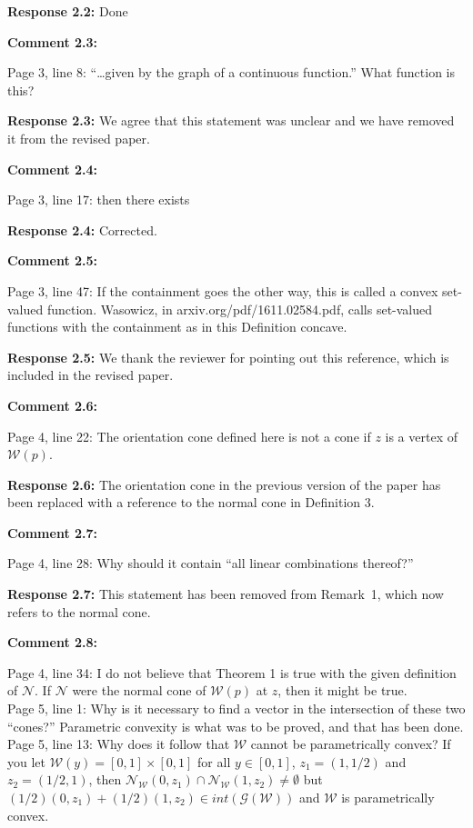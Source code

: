\documentclass[11pt, a4paper]{article}
\newcommand{\comment}[1]{{%
\begin{sffamily}\leavevmode\color{black}#1
\end{sffamily}}}%
\def\v{\vspace{2mm}}
\begin{document}
\v
\textbf{Response 2.2:}
Done

\v
\textbf{Comment 2.3:}
\comment{
Page 3, line 8: ``\dots given by the graph of a continuous function.'' What function is this?}

\v
\textbf{Response 2.3:}
We agree that this statement was unclear and we have removed it from the revised paper.

\v
\textbf{Comment 2.4:}
\comment{
Page 3, line 17: then there exists}

\v
\textbf{Response 2.4:}
Corrected.

\v
\textbf{Comment 2.5:}
\comment{
Page 3, line 47: If the containment goes the other way, this is called a convex set-valued function. Wasowicz, in arxiv.org/pdf/1611.02584.pdf, calls set-valued functions with the containment as in this Definition concave.
}

\v
\textbf{Response 2.5:}
We thank the reviewer for pointing out this reference, which is included in the revised paper.

\v
\textbf{Comment 2.6:}
\comment{
Page 4, line 22: The orientation cone defined here is not a cone if $z$ is a vertex of $\mathcal W(p)$.
}

\v
\textbf{Response 2.6:}
The orientation cone in the previous version of the paper has been replaced with a reference to the normal cone in Definition 3.

\v
\textbf{Comment 2.7:}
\comment{
Page 4, line 28: Why should it contain “all linear combinations thereof?”
}

\v
\textbf{Response 2.7:}
This statement has been removed from Remark~1, which now refers to the normal cone.

\v
\textbf{Comment 2.8:}
\comment{
Page 4, line 34: I do not believe that Theorem 1 is true with the given definition of $\mathcal N$. If $\mathcal N$ were the normal cone of $\mathcal W(p)$ at $z$, then it might be true.\\
Page 5, line 1: Why is it necessary to find a vector in the intersection of these two ``cones?'' Parametric convexity is what was to be proved, and that has been done.\\
Page 5, line 13: Why does it follow that $\mathcal W$ cannot be parametrically convex? If you let $\mathcal W(y) = [0,1] \times [0,1]$ for all $y \in [0,1]$, $z_1 = (1,1/2)$ and $z_2 = (1/2,1)$, then $\mathcal N_{\mathcal W} (0,z_1) \cap \mathcal N_{\mathcal W}(1,z_2) \neq \emptyset$ but $(1/2)(0,z_1) + (1/2)(1, z_2) \in int(\mathscr G(\mathcal W))$ and $\mathcal W$ is parametrically convex.}
\end{document}
